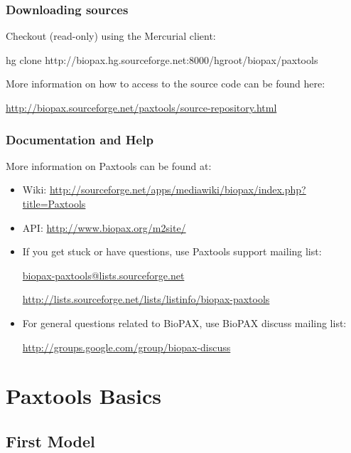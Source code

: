 \documentclass{tufte-book}
\begin{document}
\subsection{Downloading sources}

Checkout (read-only) using the Mercurial client:

\begin{fullwidth}
\begin{xmlcode}
hg clone http://biopax.hg.sourceforge.net:8000/hgroot/biopax/paxtools
\end{xmlcode}
\end{fullwidth}
More information on how to access to the source code can be found here: 	

\url{http://biopax.sourceforge.net/paxtools/source-repository.html}

\subsection{Documentation and Help}
More information on Paxtools can be found at:
\begin{fullwidth}
\begin{itemize}
\item Wiki: \url{http://sourceforge.net/apps/mediawiki/biopax/index.php?title=Paxtools} 

\item API: \url{http://www.biopax.org/m2site/}

\item If you get stuck or have questions, use Paxtools support mailing list: 	

\url{biopax-paxtools@lists.sourceforge.net}

\url{http://lists.sourceforge.net/lists/listinfo/biopax-paxtools}


\item For general questions related to BioPAX, use BioPAX discuss mailing list: 

\url{http://groups.google.com/group/biopax-discuss}

\end{itemize}
\end{fullwidth}


\chapter{Paxtools Basics}

\section{First Model}
\end{document}
